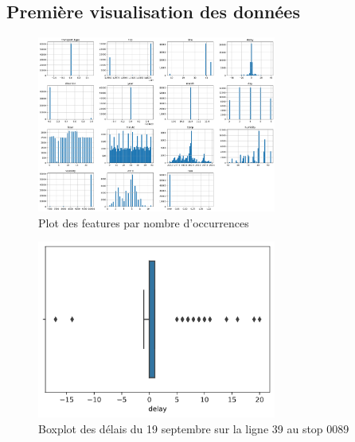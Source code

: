 \documentclass[12pt]{report}
\begin{document}
\begin{appendices}
    \chapter{Première visualisation des données}
    \begin{figure}[h]
        \centering
        \includegraphics[width=0.7\textwidth]{images/plots.png}
        \caption{Plot des features par nombre d'occurrences}
        \label{appendix:plots}
    \end{figure}

    \begin{figure}[h]
        \centering
        \includegraphics[width=0.7\textwidth]{images/boxplot.png}
        \caption{Boxplot des délais du 19 septembre sur la ligne 39 au stop 0089}
        \label{appendix:boxplot}
    \end{figure}

\end{appendices}

\lstlistoflistings

\nocite{*}
\printbibliography
\end{document}
